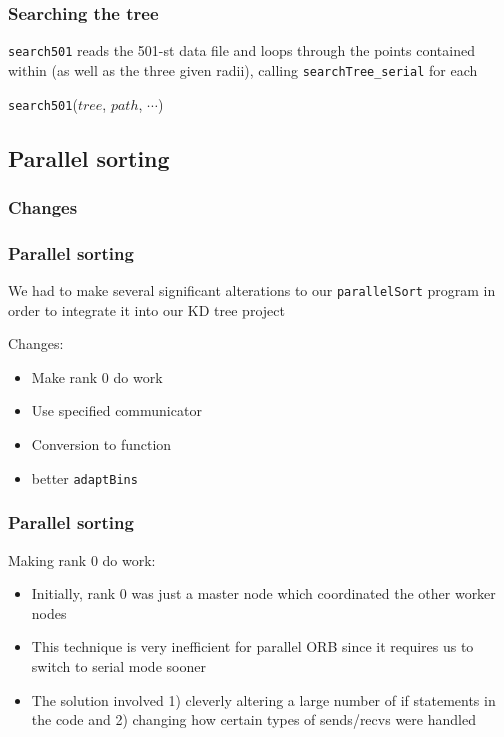 \documentclass{beamer}
\begin{document}
\begin{frame}
	\frametitle{Searching the tree}
	
	\texttt{search501} reads the 501-st data file and loops through the points contained within (as well as the three given radii), calling \texttt{searchTree\_serial} for each
	
	\vspace{10pt}
	
	\begin{algorithm}[H]
		\begin{algorithmic}[1]
			\STATE 
		\end{algorithmic}
		\caption{\texttt{search501}($tree$, $path$, $\cdots$)}
	\end{algorithm}
		
\end{frame}


\subsection{Parallel sorting}


\subsubsection{Changes}

\begin{frame}
	\frametitle{Parallel sorting}
	
	We had to make several significant alterations to our \texttt{parallelSort} program in order to integrate it into our KD tree project
	
	\vspace{10pt}
	
	\begin{block}{Changes:}
		\begin{itemize}
			\item Make rank 0 do work
			\item Use specified communicator
			\item Conversion to function
			\item better \texttt{adaptBins}
		\end{itemize}
	\end{block}
\end{frame}

\begin{frame}
	\frametitle{Parallel sorting}
	
	\begin{block}{Making rank 0 do work:}
		\begin{itemize}
			\item Initially, rank 0 was just a master node which coordinated the other worker nodes
			\item This technique is very inefficient for parallel ORB since it requires us to switch to serial mode sooner
			\item The solution involved 1) cleverly altering a large number of if statements in the code and 2) changing how certain types of sends/recvs were handled
		\end{itemize}
	\end{block}
\end{frame}
\end{document}
